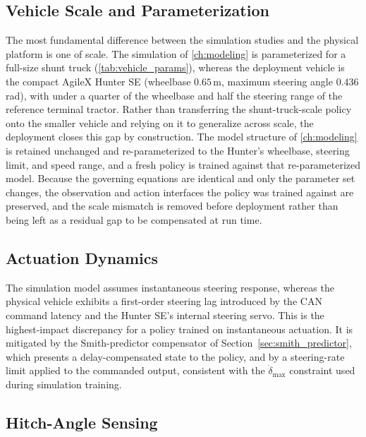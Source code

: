 \subsection{Vehicle Scale and Parameterization}
\label{sec:gap_scale}

The most fundamental difference between the simulation studies and the physical platform is one of scale. The simulation of \cref{ch:modeling} is parameterized for a full-size shunt truck (\cref{tab:vehicle_params}), whereas the deployment vehicle is the compact AgileX Hunter SE (wheelbase $0.65$\,m, maximum steering angle $0.436$\,rad), with under a quarter of the wheelbase and half the steering range of the reference terminal tractor. Rather than transferring the shunt-truck-scale policy onto the smaller vehicle and relying on it to generalize across scale, the deployment closes this gap by construction. The model structure of \cref{ch:modeling} is retained unchanged and re-parameterized to the Hunter's wheelbase, steering limit, and speed range, and a fresh policy is trained against that re-parameterized model. Because the governing equations are identical and only the parameter set changes, the observation and action interfaces the policy was trained against are preserved, and the scale mismatch is removed before deployment rather than being left as a residual gap to be compensated at run time.

\subsection{Actuation Dynamics}
\label{sec:gap_actuation}

The simulation model assumes instantaneous steering response, whereas the physical vehicle exhibits a first-order steering lag introduced by the CAN command latency and the Hunter SE's internal steering servo. This is the highest-impact discrepancy for a policy trained on instantaneous actuation. It is mitigated by the Smith-predictor compensator of Section~\ref{sec:smith_predictor}, which presents a delay-compensated state to the policy, and by a steering-rate limit applied to the commanded output, consistent with the $\dot{\delta}_\text{max}$ constraint used during simulation training.

\subsection{Hitch-Angle Sensing}
\label{sec:gap_hitch}

